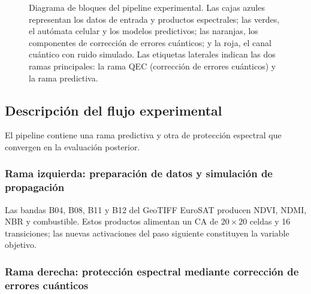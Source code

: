 \documentclass[fleqn,10pt]{wlscirep}
\begin{document}
\begin{figure}[htbp]
\caption{Diagrama de bloques del pipeline experimental. Las cajas azules representan los datos de entrada y productos espectrales; las verdes, el autómata celular y los modelos predictivos; las naranjas, los componentes de corrección de errores cuánticos; y la roja, el canal cuántico con ruido simulado. Las etiquetas laterales indican las dos ramas principales: la rama QEC (corrección de errores cuánticos) y la rama predictiva.}
\label{fig:pipeline}
\end{figure}

\subsection*{Descripción del flujo experimental}

El pipeline contiene una rama predictiva y otra de protección espectral que convergen en la evaluación posterior.

\subsubsection*{Rama izquierda: preparación de datos y simulación de propagación}

Las bandas B04, B08, B11 y B12 del GeoTIFF EuroSAT producen NDVI, NDMI, NBR y combustible. Estos productos alimentan un CA de $20\times20$ celdas y 16 transiciones; las nuevas activaciones del paso siguiente constituyen la variable objetivo.

\subsubsection*{Rama derecha: protección espectral mediante corrección de errores cuánticos}
\end{document}
